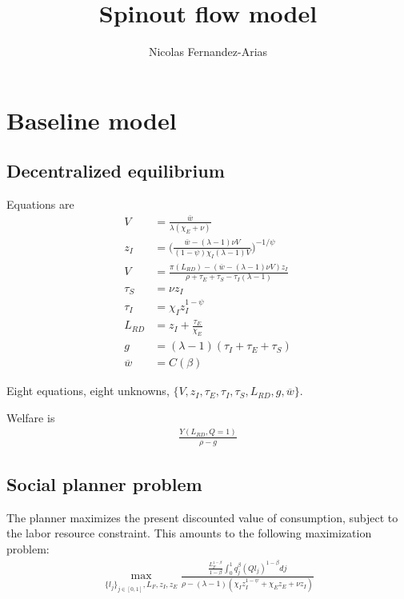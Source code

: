 \documentclass[12pt,english]{article}
\theoremstyle{remark}
\begin{document}
	
\title{Spinout flow model}
\author{Nicolas Fernandez-Arias}
\maketitle


\section{Baseline model}

\subsection{Decentralized equilibrium}

Equations are
\begin{align*}
	V &= \frac{\bar{w}}{\lambda(\chi_E + \nu)} \\
	z_I &= \Big(  \frac{\bar{w}-(\lambda-1)\nu V}{(1-\psi)\chi_I(\lambda-1)V} \Big)^{-1/\psi} \\
	V &= \frac{\pi(L_{RD}) - (\overline{w} - (\lambda-1)\nu V) z_I}{\rho + \tau_E + \tau_S - \tau_I (\lambda -1)} \\
	\tau_S &= \nu z_I \\
	\tau_I &= \chi_I z_I^{1-\psi} \\
	L_{RD} &= z_I + \frac{\tau_E}{\chi_E} \\
	g &= (\lambda - 1)(\tau_I + \tau_E+ \tau_S)  \\
	\overline{w} &= C(\beta)
\end{align*}

Eight equations, eight unknowns, $\{ V,z_I,\tau_E,\tau_I,\tau_S,L_{RD},g,\overline{w} \}$. 

Welfare is 
\begin{align*}
	\frac{Y(L_{RD},Q = 1)}{\rho - g}
\end{align*}


\subsection{Social planner problem}

The planner maximizes the present discounted value of consumption, subject to the labor resource constraint. This amounts to the following maximization problem:
\begin{align*}
	\max_{\{l_j\}_{j\in[0,1]},L_F,z_I,z_E} \frac{\frac{L_F^{1-\beta}}{1-\beta} \int_0^1 q_j^{\beta} (Q l_j)^{1-\beta} dj}{\rho - (\lambda-1)(\chi_I z_I^{1-\psi} + \chi_E z_E + \nu z_I)} 
\end{align*}
\end{document}

